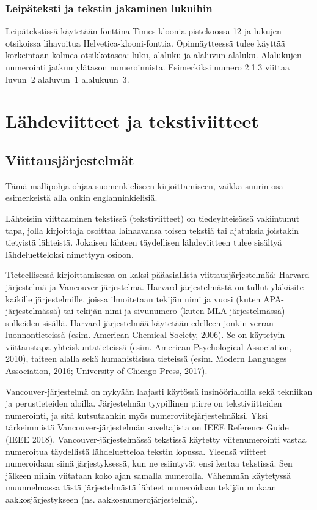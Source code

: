 \documentclass[finnish, 12pt, a4paper, elec, utf8, a-2b, online]{aaltothesis}
\begin{document}
\subsubsection*{Leipäteksti ja tekstin jakaminen lukuihin}

Leipätekstissä käytetään fonttina Times-kloonia pistekoossa 12 ja lukujen 
otsikoissa lihavoitua Helvetica-klooni-fonttia. Opinnäytteessä tulee käyttää 
korkeintaan kolmea otsikkotasoa: luku, alaluku ja alaluvun alaluku. Alalukujen 
numerointi jatkuu ylätason numeroinnista. Esimerkiksi numero 2.1.3 viittaa 
luvun~2 alaluvun~1 alalukuun~3.

\clearpage
\section{Lähdeviitteet ja tekstiviitteet}
\label{liite:viitteet}
\subsection*{Viittausjärjestelmät}

Tämä mallipohja ohjaa suomenkieliseen kirjoittamiseen, vaikka suurin osa 
esimerkeistä alla onkin englanninkielisiä.

Lähteisiin viittaaminen tekstissä (tekstiviitteet) on tiedeyhteisössä 
vakiintunut tapa, jolla kirjoittaja osoittaa lainaavansa toisen tekstiä tai 
ajatuksia joistakin tietyistä lähteistä. Jokaisen lähteen täydellisen 
lähdeviitteen tulee sisältyä lähdeluetteloksi nimettyyn osioon.

Tieteellisessä kirjoittamisessa on kaksi pääasiallista viittausjärjestelmää: 
Harvard-järjestelmä ja Vancouver-järjestelmä. Harvard-järjestelmästä on tullut 
yläkäsite kaikille järjestelmille, joissa ilmoitetaan tekijän nimi ja vuosi 
(kuten APA-järjestelmässä) tai tekijän nimi ja sivunumero (kuten 
MLA-järjestelmässä) sulkeiden sisällä. Harvard-järjestelmää käytetään edelleen 
jonkin verran luonnontieteissä (esim. American Chemical Society, 2006). Se on 
käytetyin viittaustapa yhteiskuntatieteissä (esim. American Psychological 
Association, 2010), taiteen alalla sekä humanistisissa tieteissä (esim. Modern 
Languages Association, 2016; University of Chicago Press, 2017).

Vancouver-järjestelmä on nykyään laajasti käytössä insinöörialoilla sekä 
tekniikan ja perustieteiden aloilla. Järjestelmän tyypillinen piirre on 
tekstiviitteiden numerointi, ja sitä kutsutaankin myös 
numeroviitejärjestelmäksi. Yksi tärkeimmistä Vancouver-järjestelmän soveltajista
on IEEE Reference Guide (IEEE 2018). Vancouver-järjestelmässä tekstissä käytetty 
viitenumerointi vastaa numeroitua täydellistä lähdeluetteloa tekstin lopussa. 
Yleensä viitteet numeroidaan siinä järjestyksessä, kun ne esiintyvät ensi kertaa 
tekstissä. Sen jälkeen niihin viitataan koko ajan samalla numerolla. Vähemmän 
käytetyssä muunnelmassa tästä järjestelmästä lähteet numeroidaan tekijän mukaan 
aakkosjärjestykseen (ns. aakkosnumerojärjestelmä).
\end{document}
